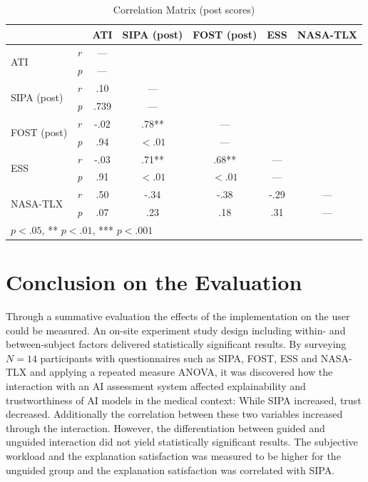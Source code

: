 \documentclass[11pt,a4paper,english]{scrreprt}
\begin{document}
\begin{table}[htbp]
    \centering
    \begin{tabularx}{0.9\textwidth}{ l l c c c c c }
        \toprule
        & & ATI & SIPA (post) & FOST (post) & ESS & NASA-TLX \\
        \midrule
        \multirow[t]{2}{*}{ATI} & \textit{r} & --- & & & & \\
        & \textit{p} & --- & & & & \\
        \multirow[t]{2}{*}{SIPA (post)} & \textit{r} & .10 & --- & & & \\
        & \textit{p} & .739 & --- & & & \\
        \multirow[t]{2}{*}{FOST (post)} & \textit{r} & -.02 & .78** & --- & & \\
        & \textit{p} & .94 & $<.01$ & --- & & \\
        \multirow[t]{2}{*}{ESS} & \textit{r} & -.03 & .71** & .68** & --- & \\
        & \textit{p} & .91 & $<.01$ & $<.01$ & --- & \\
        \multirow[t]{2}{*}{NASA-TLX} & \textit{r} & .50 & -.34 & -.38 & -.29 & --- \\
        & \textit{p} & .07 & .23 & .18 & .31 & --- \\
        \bottomrule
        \multicolumn{7}{l}{\footnotesize * $\textit{p}<.05$, ** $\textit{p}<.01$, *** $\textit{p}<.001$} \\
    \end{tabularx}
    \caption{Correlation Matrix (post scores)}
    \label{table:correlation_matrix_post}
\end{table}

\newpage
\section{Conclusion on the Evaluation}
Through a summative evaluation the effects of the implementation on the user could be measured. An on-site experiment study design including within- and between-subject factors delivered statistically significant results. By surveying $\textit{N}=14$ participants with questionnaires such as SIPA, FOST, ESS and NASA-TLX and applying a repeated measure ANOVA, it was discovered how the interaction with an AI assessment system affected explainability and trustworthiness of AI models in the medical context: While SIPA increased, trust decreased. Additionally the correlation between these two variables increased through the interaction. However, the differentiation between guided and unguided interaction did not yield statistically significant results. The subjective workload and the explanation satisfaction was measured to be higher for the unguided group and the explanation satisfaction was correlated with SIPA. 
\end{document}
